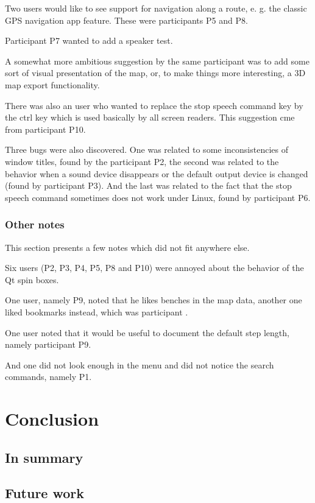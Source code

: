 \documentclass[nolof,digital]{fithesis3}
\begin{document}
Two users would like to see support for navigation along a route, e. g. the classic GPS navigation app feature. These were participants P5 and P8.

Participant P7 wanted to add a speaker test.

A somewhat more ambitious suggestion by the same participant was to add some sort of visual presentation of the map, or, to make things more interesting, a 3D map export functionality.

There was also an user who wanted to replace the stop speech command key by the ctrl key which is used basically by all screen readers. This suggestion cme from participant P10.

Three bugs were also discovered. One was related to some inconsistencies of window titles, found by the participant P2, the second was related to the behavior when a sound device disappears or the default output device is changed (found by participant P3). And the last was related to the fact that the stop speech command sometimes does not work under Linux, found by participant P6.
\subsection{Other notes}
This section presents a few notes which did not fit anywhere else.

Six users (P2, P3, P4, P5, P8 and P10) were annoyed about the behavior of the Qt spin boxes.

One user, namely P9, noted that he likes benches in the map data, another one liked bookmarks instead, which was participant .

One user noted that it would be useful to document the default step length, namely participant P9.

And one did not look enough in the menu and did not notice the search commands, namely P1.
\chapter{Conclusion}
\section{In summary}
\section{Future work}
\end{document}
